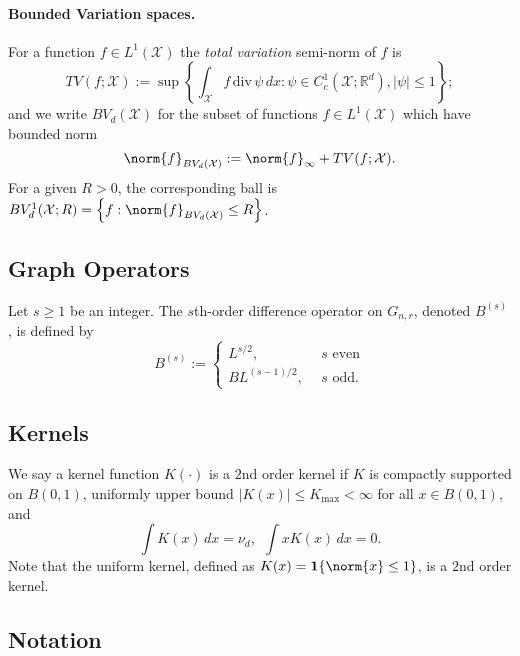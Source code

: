 \documentclass{article}
\newcommand{\Reals}{\mathbb{R}}
\newcommand{\abs}[1]{\left \lvert #1 \right \rvert}
\newcommand{\set}[1]{\left\{#1\right\}}
\newcommand{\1}{\mathbf{1}}
\newcommand{\Xsetive}{\mathrm{div}}
\theoremstyle{alden}
\theoremstyle{aldenthm}
\theoremstyle{definition}
\theoremstyle{remark}
\begin{document}
\paragraph{Bounded Variation spaces.}

For a function $f \in L^1(\mathcal{X})$ the \emph{total variation} semi-norm of $f$ is
\begin{equation*}
TV(f;\mathcal{X}) := \sup \left\{ \int_{\mathcal{X}} f \, \Xsetive \, \psi \,dx : \psi \in C_c^1(\mathcal{X}; \Reals^d), \abs{\psi} \leq 1 \right\};
\end{equation*}
and we write $BV_d(\mathcal{X})$ for the subset of functions $f \in L^1(\mathcal{X})$ which have bounded norm
\begin{equation*}
\norm{f}_{BV_d(\mathcal{X})} := \norm{f}_{\infty} + TV(f;\mathcal{X}).
\end{equation*}
For a given $R > 0$, the corresponding ball is $BV_d^{1}(\mathcal{X};R) = \set{f: \norm{f}_{BV_d(\mathcal{X})} \leq R}$. 

\subsection{Graph Operators}
Let $s \geq 1$ be an integer. The $s$th-order difference operator on $G_{n,r}$, denoted $B^{(s)}$, is defined by
\begin{equation*}
B^{(s)} :=
\begin{cases}
L^{s/2},& ~~ s \textrm{ even} \\
BL^{(s - 1)/2},& ~~ s \textrm{ odd.}
\end{cases}
\end{equation*}

\subsection{Kernels}
We say a kernel function $K(\cdot)$ is a $2$nd order kernel if $K$ is compactly supported on $B(0,1)$, uniformly upper bound $\abs{K(x)} \leq K_{\max} < \infty$ for all $x \in B(0,1)$, and
\begin{equation*}
\int K(x) \,dx = \nu_d,~~ \int x K(x) \,dx = 0.
\end{equation*}
Note that the uniform kernel, defined as $K(x) = \1\{\norm{x} \leq 1\}$, is a $2$nd order kernel. 

\subsection{Notation}
\end{document}

